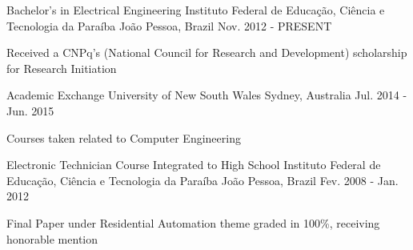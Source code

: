 

\begin{cventries}

  \cventry
    {Bachelor's in Electrical Engineering} %
    {Instituto Federal de Educação, Ciência e Tecnologia da Paraíba} %
    {João Pessoa, Brazil} %
    {Nov. 2012 - PRESENT} %
    {
	\begin{cvitems} %
		\item {Received a CNPq's (National Council for Research and Development) scholarship for Research Initiation}
	\end{cvitems}
    }

    \cventry
    {Academic Exchange} %
    {University of New South Wales} %
    {Sydney, Australia} %
    {Jul. 2014 - Jun. 2015} %
    {
		\begin{cvitems} %
        	\item {Courses taken related to Computer Engineering}
        \end{cvitems}
    }

    \cventry
    {Electronic Technician Course Integrated to High School}
    {Instituto Federal de Educação, Ciência e Tecnologia da Paraíba}
    {João Pessoa, Brazil}
    {Fev. 2008 - Jan. 2012}
    {
		\begin{cvitems}
        \item {Final Paper under Residential Automation theme graded in 100\%, receiving honorable mention}
        \end{cvitems}
    }

\end{cventries}
